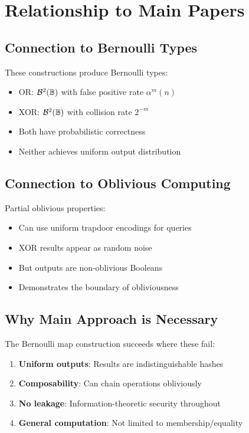 \documentclass[11pt,final]{article}
\begin{document}
\section{Relationship to Main Papers}

\subsection{Connection to Bernoulli Types}

These constructions produce Bernoulli types:
\begin{itemize}
    \item OR: $\mathcal{B}^{2}(\mathbb{B})$ with false positive rate $\alpha^m(n)$
    \item XOR: $\mathcal{B}^{2}(\mathbb{B})$ with collision rate $2^{-m}$
    \item Both have probabilistic correctness
    \item Neither achieves uniform output distribution
\end{itemize}

\subsection{Connection to Oblivious Computing}

Partial oblivious properties:
\begin{itemize}
    \item Can use uniform trapdoor encodings for queries
    \item XOR results appear as random noise
    \item But outputs are non-oblivious Booleans
    \item Demonstrates the boundary of obliviousness
\end{itemize}

\subsection{Why Main Approach is Necessary}

The Bernoulli map construction succeeds where these fail:
\begin{enumerate}
    \item \textbf{Uniform outputs}: Results are indistinguishable hashes
    \item \textbf{Composability}: Can chain operations obliviously
    \item \textbf{No leakage}: Information-theoretic security throughout
    \item \textbf{General computation}: Not limited to membership/equality
\end{enumerate}
\end{document}
